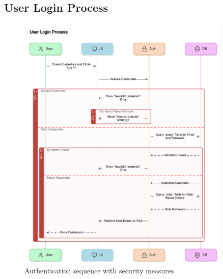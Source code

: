 \subsection{User Login Process}
\begin{figure}[H]
    \centering
    \includegraphics[width=0.9\textwidth]{images/sequence_diagrams/user_login_process.png}
    \caption{Authentication sequence with security measures}
    \label{fig:user_login}
\end{figure}

